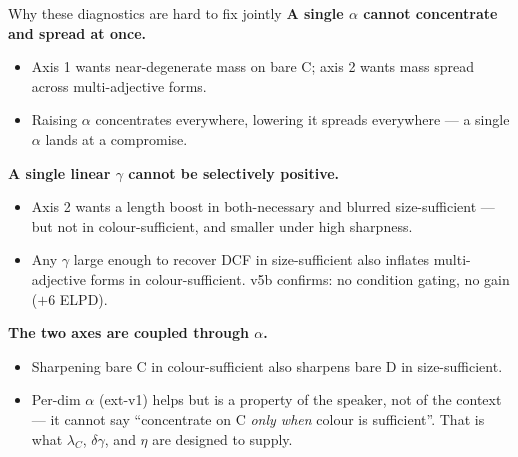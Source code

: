 \documentclass[10pt,aspectratio=169]{beamer}
\newcommand{\main}[1]{\textcolor{CSP-main-dark}{\textbf{#1}}}
\begin{document}
\begin{frame}{Why these diagnostics are hard to fix jointly}
\small
\main{A single $\alpha$ cannot concentrate and spread at once.}
\begin{itemize}\itemsep0.1em
  \item Axis 1 wants near-degenerate mass on bare C; axis 2 wants mass spread across multi-adjective forms.
  \item Raising $\alpha$ concentrates everywhere, lowering it spreads everywhere --- a single $\alpha$ lands at a compromise.
\end{itemize}

\vspace{0.5em}
\main{A single linear $\gamma$ cannot be selectively positive.}
\begin{itemize}\itemsep0.1em
  \item Axis 2 wants a length boost in both-necessary and blurred size-sufficient --- but not in colour-sufficient, and smaller under high sharpness.
  \item Any $\gamma$ large enough to recover DCF in size-sufficient also inflates multi-adjective forms in colour-sufficient. v5b confirms: no condition gating, no gain ($+6$ ELPD).
\end{itemize}

\vspace{0.5em}
\main{The two axes are coupled through $\alpha$.}
\begin{itemize}\itemsep0.1em
  \item Sharpening bare C in colour-sufficient also sharpens bare D in size-sufficient.
  \item Per-dim $\alpha$ (ext-v1) helps but is a property of the speaker, not of the context --- it cannot say ``concentrate on C \emph{only when} colour is sufficient''. That is what $\lambda_C$, $\delta\gamma$, and $\eta$ are designed to supply.
\end{itemize}
\end{frame}
\end{document}
